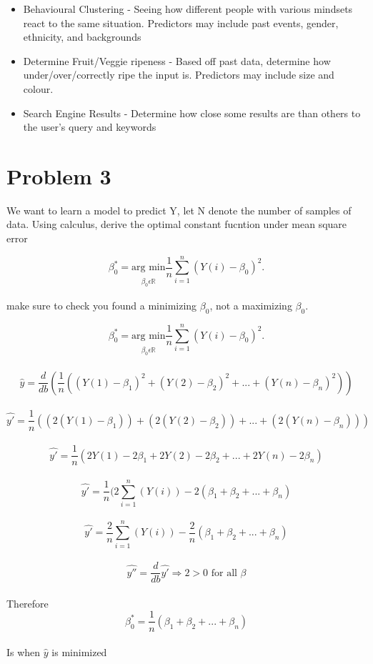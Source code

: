 \documentclass[11pt]{article}
\begin{document}
\begin{enumerate}[label=(\alph*)]
          \begin{itemize}
              \item Behavioural Clustering - Seeing how different people with various mindsets react to the same situation. Predictors may include past events, gender, ethnicity, and backgrounds
              \item Determine Fruit/Veggie ripeness - Based off past data, determine how under/over/correctly ripe the input is. Predictors may include size and colour.
              \item Search Engine Results - Determine how close some results are than others to the user's query and keywords
          \end{itemize}
\end{enumerate}


\pagebreak
\section{Problem 3}
We want to learn a model to predict Y, let N denote the number of samples of data. Using calculus, derive the optimal constant fucntion under mean square error
\begin{center}
    \[
        \beta_{0}^{*} = \underset{\substack{\\ \beta_{0} \epsilon \mathbb{R} } } {\text{arg min} } \frac{1}{n} \sum_{i = 1}^{n}(Y(i) - \beta_{0})^{2} \text{.}
    \]
\end{center}
make sure to check you found a minimizing $\beta_{0}$, not a maximizing $\beta_{0}$.\\

\begin{center}
    \[
        \beta_{0}^{*} = \underset{\substack{\\ \beta_{0} \epsilon \mathbb{R} } } {\text{arg min} } \frac{1}{n} \sum_{i = 1}^{n}(Y(i) - \beta_{0})^{2} \text{.}
    \]\\
    \[
        \hat{y} = \frac{d}{db}(\frac{1}{n}((Y(1)-\beta_1)^2 + (Y(2)-\beta_2)^2 + ... +(Y(n)-\beta_n)^2))
    \]\\
    \[
        \hat{y'} = \frac{1}{n}((2(Y(1)-\beta_1)) + (2(Y(2)-\beta_2)) + ... + (2(Y(n)-\beta_n)))
    \]\\
    \[
        \hat{y'} = \frac{1}{n}(2Y(1) - 2\beta_1 + 2Y(2) - 2\beta_2 + ... + 2Y(n) - 2\beta_n)
    \]\\
    \[
        \hat{y'} = \frac{1}{n}(2\sum_{i=1}^{n}(Y(i)) - 2(\beta_1 + \beta_2 + ... + \beta_n)
    \]\\
    \[
        \hat{y'} = \frac{2}{n}\sum_{i=1}^{n}(Y(i)) - \frac{2}{n}(\beta_1 + \beta_2 + ... + \beta_n)
    \]\\
    \[
        \hat{y''} = \frac{d}{db}\hat{y'}\Rightarrow 2 > 0 \text{ for all }\beta
    \]\\
    Therefore
    \[
        \beta_{0}^{*} = \frac{1}{n}(\beta_1 + \beta_2 + ... + \beta_n)
    \]\\
    Is when $\hat{y}$ is minimized
\end{center}

\end{document}
